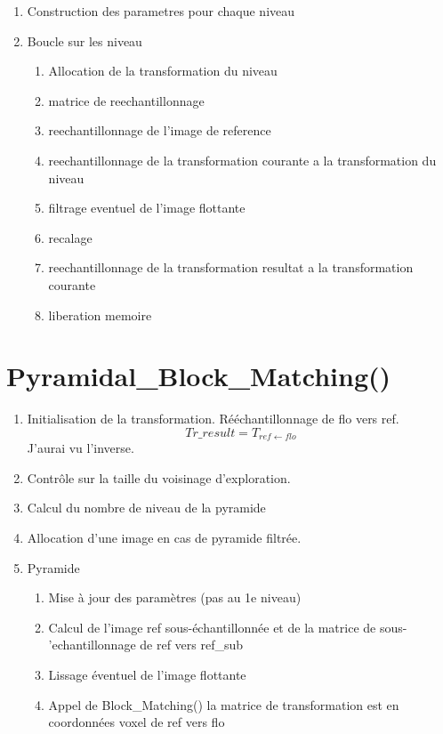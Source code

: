 \documentclass[10pt]{report}
\begin{document}
\begin{enumerate}

\item Construction des parametres pour chaque niveau

\item Boucle sur les niveau

\begin{enumerate}
\item Allocation de la transformation du niveau
\item matrice de reechantillonnage
\item reechantillonnage de l'image de reference
\item reechantillonnage de la transformation courante a la transformation du niveau
\item filtrage eventuel de l'image flottante
\item recalage
\item reechantillonnage de la transformation resultat a la transformation courante
\item liberation memoire
\end{enumerate}


\end{enumerate}




\newpage
\section{Pyramidal\_Block\_Matching()}

\begin{enumerate}

\item Initialisation de la transformation. R\'e\'echantillonnage de flo vers ref.
$$ Tr\_result = T_{ref \leftarrow flo}$$
J'aurai vu l'inverse. 

\item Contr\^ole sur la taille du voisinage d'exploration.

\item Calcul du nombre de niveau de la pyramide

\item Allocation d'une image en cas de pyramide filtr\'ee.

\item Pyramide

\begin{enumerate}

\item Mise \`a jour des paramètres (pas au 1e niveau)

\item Calcul de l'image ref sous-\'echantillonn\'ee et de la matrice de sous-
'echantillonnage de ref vers ref\_sub

\item Lissage \'eventuel de l'image flottante

\item Appel de Block\_Matching() 
la matrice de transformation est en coordonn\'ees voxel de ref vers flo

\end{enumerate}

\end{enumerate}
\end{document}
